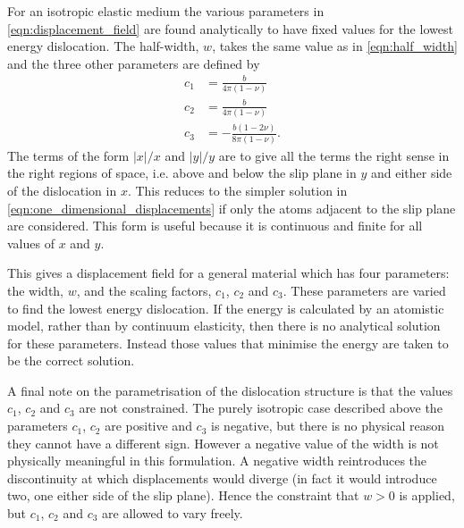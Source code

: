 For an isotropic elastic medium the various parameters in \autoref{eqn:displacement_field} are found analytically  to have fixed values for the lowest energy dislocation. The half-width, $w$, takes the same value as in \autoref{eqn:half_width} and the three other parameters are defined by
\begin{subequations}\label{eqn:disloc_params}
\begin{align}
c_1 &= \frac{b}{4\pi{}(1-\nu)} \\
c_2 &= \frac{b}{4\pi{}(1-\nu)} \\
c_3 &= - \frac{b(1-2\nu)}{8\pi(1-\nu)}.
\end{align}
\label{eqn:expressions_for_the_ideal_disloca_parameters}
\end{subequations}
The terms of the form $|x|/x$ and $|y|/y$ are to give all the terms the right sense in the right regions of space, i.e. above and below the slip plane in $y$ and either side of the dislocation in $x$. This reduces to the simpler solution in \autoref{eqn:one_dimensional_displacements} if only the atoms adjacent to the slip plane are considered. This form is useful because it is continuous and finite for all values of $x$ and $y$. 


This gives a displacement field for a general material  which has four parameters: the width, $w$, and the scaling factors, $c_1$, $c_2$ and $c_3$. These parameters are varied to find the lowest energy dislocation. If the energy is calculated by an atomistic model, rather than by continuum elasticity, then there is no analytical solution for these parameters. Instead those values that minimise the energy are taken to be the correct solution.







A final note on the parametrisation of the dislocation structure is that the values $c_1$, $c_2$ and $c_3$ are not constrained. The purely isotropic case described above the parameters $c_1$, $c_2$ are positive and $c_3$ is negative, but there is no physical reason they cannot have a different sign. However a negative value of the width is not physically meaningful in this formulation. A negative width reintroduces the discontinuity at which displacements would diverge (in fact it would introduce two, one either side of the slip plane). Hence the constraint that $w>0$ is applied, but $c_1$, $c_2$ and $c_3$ are allowed to vary freely.




























